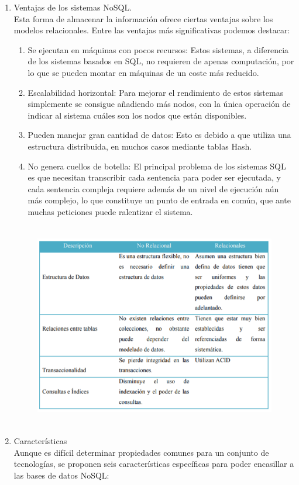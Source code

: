 \documentclass[12pt,a4paper,oneside]{book}
\begin{document}
\begin{enumerate}
\begin{enumerate}
			
			\item Ventajas de los sistemas NoSQL.\\
			Esta forma de almacenar la información ofrece ciertas ventajas sobre los modelos relacionales. Entre las ventajas más significativas podemos destacar:\\
			\begin{enumerate}
				\item Se ejecutan en máquinas con pocos recursos: Estos sistemas, a diferencia de los sistemas basados en SQL, no requieren de apenas computación, por lo que se pueden montar en máquinas de un coste más reducido. 	\\
				\item Escalabilidad horizontal: Para mejorar el rendimiento de estos sistemas simplemente se consigue añadiendo más nodos, con la única operación de indicar al sistema cuáles son los nodos que están disponibles.
				\item Pueden manejar gran cantidad de datos: Esto es debido a que utiliza una estructura distribuida, en muchos casos mediante tablas Hash.\\
				\item No genera cuellos de botella: El principal problema de los sistemas SQL es que necesitan transcribir cada sentencia para poder ser ejecutada, y cada sentencia compleja requiere además de un nivel de ejecución aún más complejo, lo que constituye un punto de entrada en común, que ante muchas peticiones puede ralentizar el sistema.\\
			\end{enumerate}
		
				\begin{figure}[htb]
					\centering \includegraphics[width=12cm, height=9cm]{img/ventajas.png}
				\end{figure}
			\item Características\\
			Aunque es difícil determinar propiedades comunes para un conjunto de tecnologías, se proponen seis características específicas para poder encasillar a las
			bases de datos NoSQL:\\
			

\end{enumerate}
\end{enumerate}
\end{document}
